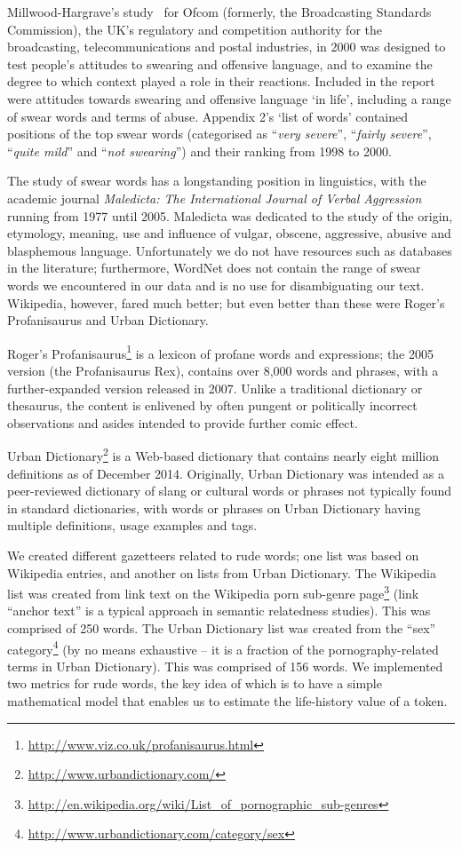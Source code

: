 \documentclass{AISB2008}
\begin{document}
Millwood-Hargrave's study~\cite{millwood-hargrave:2000} for Ofcom
(formerly, the Broadcasting Standards Commission), the UK's regulatory
and competition authority for the broadcasting, telecommunications and
postal industries, in 2000 was designed to test people's attitudes to
swearing and offensive language, and to examine the degree to which
context played a role in their reactions. Included in the report were
attitudes towards swearing and offensive language `in life', including
a range of swear words and terms of abuse. Appendix 2's `list of
words' contained positions of the top swear words (categorised as
``{\emph{very severe}}'', ``{\emph{fairly severe}}'', ``{\emph{quite
mild}}'' and ``{\emph{not swearing}}'') and their ranking from 1998 to
2000.

The study of swear words has a longstanding position in linguistics,
with the academic journal {\emph{Maledicta: The International Journal
of Verbal Aggression}} running from 1977 until 2005. Maledicta was
dedicated to the study of the origin, etymology, meaning, use and
influence of vulgar, obscene, aggressive, abusive and blasphemous
language. Unfortunately we do not have resources such as databases in
the literature; furthermore, WordNet does not contain the range of
swear words we encountered in our data and is no use for
disambiguating our text. Wikipedia, however, fared much better; but
even better than these were Roger's Profanisaurus and Urban
Dictionary.

Roger's
Profanisaurus\footnote{\url{http://www.viz.co.uk/profanisaurus.html}}
is a lexicon of profane words and expressions; the 2005 version (the
Profanisaurus Rex), contains over 8,000 words and phrases, with a
further-expanded version released in 2007. Unlike a traditional
dictionary or thesaurus, the content is enlivened by often pungent or
politically incorrect observations and asides intended to provide
further comic effect.

Urban Dictionary\footnote{\url{http://www.urbandictionary.com/}} is a
Web-based dictionary that contains nearly eight million definitions as
of December 2014. Originally, Urban Dictionary was intended as a
peer-reviewed dictionary of slang or cultural words or phrases not
typically found in standard dictionaries, with words or phrases on
Urban Dictionary having multiple definitions, usage examples and tags.

We created different gazetteers related to rude words; one list was
based on Wikipedia entries, and another on lists from Urban
Dictionary. The Wikipedia list was created from link text on the
Wikipedia porn sub-genre
page\footnote{\url{http://en.wikipedia.org/wiki/List_of_pornographic_sub-genres}}
(link ``anchor text'' is a typical approach in semantic relatedness
studies). This was comprised of 250 words. The Urban Dictionary list
was created from the ``sex''
category\footnote{\url{http://www.urbandictionary.com/category/sex}}
(by no means exhaustive -- it is a fraction of the pornography-related
terms in Urban Dictionary). This was comprised of 156 words. We
implemented two metrics for rude words, the key idea of which is to
have a simple mathematical model that enables us to estimate the
life-history value of a token.
\end{document}
